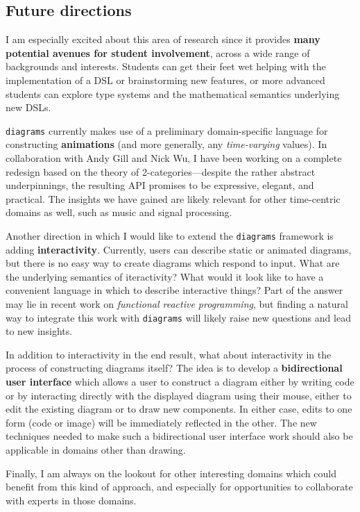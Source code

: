 \documentclass[12pt]{article}
\begin{document}
\subsection*{Future directions}

I am especially excited about this area of research since it provides
\textbf{many potential avenues for student involvement}, across a wide
range of backgrounds and interests.  Students can get their feet wet
helping with the implementation of a DSL or brainstorming new
features, or more advanced students can explore type systems and the
mathematical semantics underlying new DSLs.

\texttt{diagrams} currently makes use of a preliminary domain-specific
language for constructing \textbf{animations} (and more generally, any
\emph{time-varying} values).  In collaboration with Andy Gill and Nick
Wu, I have been working on a complete redesign based on the theory of
2-categories---despite the rather abstract underpinnings, the
resulting API promises to be expressive, elegant, and practical.  The
insights we have gained are likely relevant for other time-centric
domains as well, such as music and signal processing.

Another direction in which I would like to extend the
\texttt{diagrams} framework is adding \textbf{interactivity}.
Currently, users can describe static or animated diagrams, but there
is no easy way to create diagrams which respond to input.  What are
the underlying semantics of iteractivity?  What would it look like to
have a convenient language in which to describe interactive things?
Part of the answer may lie in recent work on \emph{functional reactive
  programming}, but finding a natural way to integrate this work with
\texttt{diagrams} will likely raise new questions and lead to new
insights.

In addition to interactivity in the end result, what about
interactivity in the process of constructing diagrams itself?  The
idea is to develop a \textbf{bidirectional user interface} which
allows a user to construct a diagram either by writing code or by
interacting directly with the displayed diagram using their mouse,
either to edit the existing diagram or to draw new components.  In
either case, edits to one form (code or image) will be immediately
reflected in the other.  The new techniques needed to make such a
bidirectional user interface work should also be applicable in domains
other than drawing.

Finally, I am always on the lookout for other interesting domains
which could benefit from this kind of approach, and especially for
opportunities to collaborate with experts in those domains.



\end{document}
